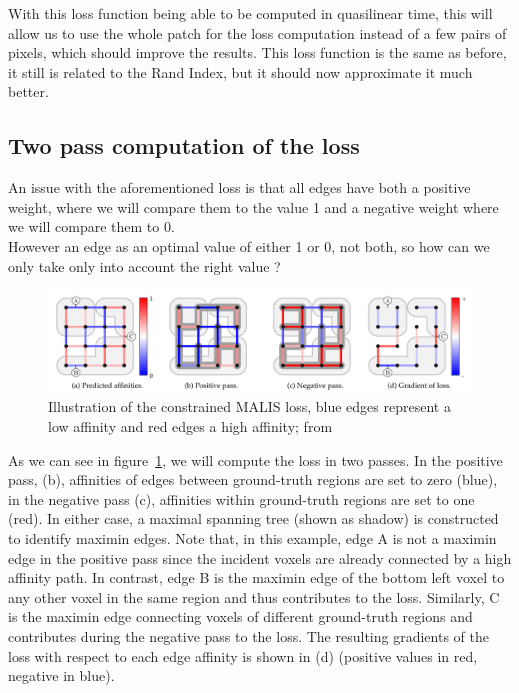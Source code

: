 With this loss function being able to be computed in quasilinear time, this
will allow us to use the whole patch for the loss computation instead of a few
pairs of pixels, which should improve the results. This loss function is the
same as before, it still is related to the Rand Index, but it should now
approximate it much better.\\

\subsection{Two pass computation of the loss}

An issue with the aforementioned loss is that all edges have both a positive
weight, where we will compare them to the value 1 and a negative weight where
we will compare them to 0.\\

However an edge as an optimal value of either 1 or 0, not both, so how can we
only take only into account the right value ?

\begin{figure}[!htpb]
	\centering
	\includegraphics[width=1\linewidth]{./images/two_pass.png}
	\caption{Illustration of the constrained MALIS loss, blue edges represent a
	low affinity and red edges a high affinity; from~\cite{funke_large_2019}}%
	\label{fig:two-pass}
\end{figure}

As we can see in figure~\ref{fig:two-pass}, we will compute the loss in two
passes.
In the positive pass, (b), affinities of edges between ground-truth regions are
set to zero (blue), in the negative pass (c), affinities within ground-truth
regions are set to one (red). In either case, a maximal spanning tree (shown as
shadow) is constructed to identify maximin edges. Note that, in this example,
edge A is not a maximin edge in the positive pass since the incident voxels are
already connected by a high affinity path. In contrast, edge B is the maximin
edge of the bottom left voxel to any other voxel in the same region and thus
contributes to the loss. Similarly, C is the maximin edge connecting voxels of
different ground-truth regions and contributes during the negative pass to the
loss. The resulting gradients of the loss with respect to each edge affinity is
shown in (d) (positive values in red, negative in blue).\\

